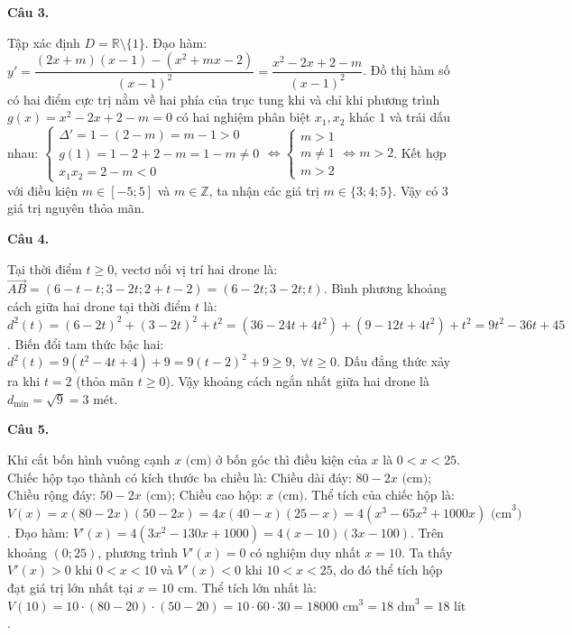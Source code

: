 \documentclass[12pt,a4paper]{article}
\newcommand{\loigiai}[1]{\par\medskip\Needspace{4\baselineskip}\noindent\textbf{#1}\par\nobreak}
\begin{document}
\loigiai{Câu 3.}
Tập xác định $D=\mathbb{R}\setminus\{1\}$.
Đạo hàm: $y'=\dfrac{(2x+m)(x-1)-(x^2+mx-2)}{(x-1)^2}=\dfrac{x^2-2x+2-m}{(x-1)^2}$.
Đồ thị hàm số có hai điểm cực trị nằm về hai phía của trục tung khi và chỉ khi phương trình $g(x)=x^2-2x+2-m=0$ có hai nghiệm phân biệt $x_1, x_2$ khác $1$ và trái dấu nhau:
$\begin{cases}\Delta'=1-(2-m)=m-1>0\\ g(1)=1-2+2-m=1-m\ne 0\\ x_1 x_2=2-m<0\end{cases}\Leftrightarrow\begin{cases}m>1\\ m\ne 1\\ m>2\end{cases}\Leftrightarrow m>2$.
Kết hợp với điều kiện $m\in[-5;5]$ và $m\in\mathbb{Z}$, ta nhận các giá trị $m\in\{3;4;5\}$.
Vậy có $3$ giá trị nguyên thỏa mãn.

\loigiai{Câu 4.}
Tại thời điểm $t\ge 0$, vectơ nối vị trí hai drone là:
$\vec{AB}=(6-t-t;3-2t;2+t-2)=(6-2t;3-2t;t)$.
Bình phương khoảng cách giữa hai drone tại thời điểm $t$ là:
$d^2(t)=(6-2t)^2+(3-2t)^2+t^2=(36-24t+4t^2)+(9-12t+4t^2)+t^2=9t^2-36t+45$.
Biến đổi tam thức bậc hai:
$d^2(t)=9(t^2-4t+4)+9=9(t-2)^2+9\ge 9,\ \forall t\ge 0$.
Dấu đẳng thức xảy ra khi $t=2$ (thỏa mãn $t\ge 0$).
Vậy khoảng cách ngắn nhất giữa hai drone là $d_{\min}=\sqrt{9}=3\text{ mét}$.

\loigiai{Câu 5.}
Khi cắt bốn hình vuông cạnh $x\text{ (cm)}$ ở bốn góc thì điều kiện của $x$ là $0<x<25$.
Chiếc hộp tạo thành có kích thước ba chiều là:
Chiều dài đáy: $80-2x\text{ (cm)}$;
Chiều rộng đáy: $50-2x\text{ (cm)}$;
Chiều cao hộp: $x\text{ (cm)}$.
Thể tích của chiếc hộp là:
$V(x)=x(80-2x)(50-2x)=4x(40-x)(25-x)=4(x^3-65x^2+1000x)\text{ (cm}^3\text{)}$.
Đạo hàm: $V'(x)=4(3x^2-130x+1000)=4(x-10)(3x-100)$.
Trên khoảng $(0;25)$, phương trình $V'(x)=0$ có nghiệm duy nhất $x=10$.
Ta thấy $V'(x)>0$ khi $0<x<10$ và $V'(x)<0$ khi $10<x<25$, do đó thể tích hộp đạt giá trị lớn nhất tại $x=10\text{ cm}$.
Thể tích lớn nhất là:
$V(10)=10\cdot(80-20)\cdot(50-20)=10\cdot 60\cdot 30=18000\text{ cm}^3=18\text{ dm}^3=18\text{ lít}$.
\end{document}
